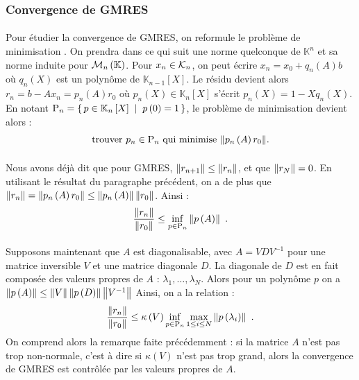 		\subsubsection{Convergence de GMRES}

			\paragraph{}
			Pour étudier la convergence de GMRES, on reformule le problème de minimisation \cite{TrefethenBau1997}.
			On prendra dans ce qui suit une norme quelconque de $\mathbb{K}^n$ et sa norme induite pour $\mathcal{M}_{n}\left(\mathbb{K}\right)$.
			Pour $x_n\in\krylov{n}$, on peut écrire $x_n = x_0 + q_n\left(A\right)b$ où $q_n\left(X\right)$ est un polynôme de $\mathbb{K}_{n-1}\left[X\right]$.
			Le résidu devient alors $r_n = b - Ax_n = p_n\left(A\right)r_0$ où $p_n\left(X\right)\in\mathbb{K}_n\left[X\right]$ s'écrit $p_n\left(X\right) = 1 - Xq_n\left(X\right)$.
			En notant $\textup{P}_n = \left\{\,p\in\mathbb{K}_n\left[X\right]\;\mid\;p\left(0\right) = 1\,\right\}$, le problème de minimisation devient alors :
			\[\textrm{trouver $p_n\in \textup{P}_n$ qui minimise $\norm{p_n\left(A\right)r_0}$.}\]


			\paragraph{}
			Nous avons déjà dit que pour GMRES, $\norm{r_{n+1}}\leq\norm{r_n}$, et que $\norm{r_N} = 0$.
			En utilisant le résultat du paragraphe précédent, on a de plus que $\norm{r_n} = \norm{p_n\left(A\right)r_0}\leq\norm{p_n\left(A\right)}\norm{r_0}$. Ainsi :
			\[\frac{\norm{r_n}}{\norm{r_0}} \leq \inf_{p\in\textup{P}_n}\norm{p\left(A\right)}\ .\]

			\paragraph{}
			Supposons maintenant que $A$ est diagonalisable, avec $A = VDV^{-1}$ pour une matrice inversible $V$ et une matrice diagonale $D$.
			La diagonale de $D$ est en fait composée des valeurs propres de $A$ : $\lambda_1, \dots, \lambda_N$.
			Alors pour un polynôme $p$ on a $\norm{p\left(A\right)}\leq\norm{V}\norm{p\left(D\right)}\norm{V^{-1}}$
			Ainsi, on a la relation :
			\[\frac{\norm{r_n}}{\norm{r_0}} \leq \kappa\left(V\right)\inf_{p\in\textup{P}_n}\max_{1\leq i\leq N}\norm{p\left(\lambda_i\right)}\ .\]
			On comprend alors la remarque faite précédemment : si la matrice $A$ n'est pas trop non-normale, c'est à dire si $\kappa\left(V\right)$ n'est pas trop grand, alors la convergence de GMRES est contrôlée par les valeurs propres de $A$.


